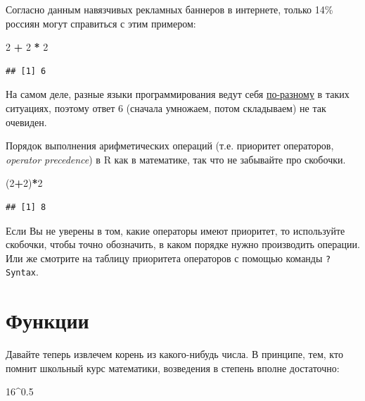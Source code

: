 \documentclass[]{book}
\newenvironment{Shaded}{\begin{snugshade}}{\end{snugshade}}
\newcommand{\DecValTok}[1]{\textcolor[rgb]{0.00,0.00,0.81}{#1}}
\newcommand{\FloatTok}[1]{\textcolor[rgb]{0.00,0.00,0.81}{#1}}
\newcommand{\StringTok}[1]{\textcolor[rgb]{0.31,0.60,0.02}{#1}}
\newcommand{\OperatorTok}[1]{\textcolor[rgb]{0.81,0.36,0.00}{\textbf{#1}}}
\newcommand{\NormalTok}[1]{#1}
\begin{document}
Согласно данным навязчивых рекламных баннеров в интернете, только 14\%
россиян могут справиться с этим примером:

\begin{Shaded}
\begin{Highlighting}[]
\DecValTok{2} \OperatorTok{+}\StringTok{ }\DecValTok{2} \OperatorTok{*}\StringTok{ }\DecValTok{2}
\end{Highlighting}
\end{Shaded}

\begin{verbatim}
## [1] 6
\end{verbatim}

На самом деле, разные языки программирования ведут себя
\href{https://www.quora.com/Do-all-computer-languages-with-operator-precedence-use-the-same-operator-precedence}{по-разному}
в таких ситуациях, поэтому ответ 6 (сначала умножаем, потом складываем)
не так очевиден.

Порядок выполнения арифметических операций (т.е. приоритет операторов,
\emph{operator precedence}) в R как в математике, так что не забывайте
про скобочки.

\begin{Shaded}
\begin{Highlighting}[]
\NormalTok{(}\DecValTok{2}\OperatorTok{+}\DecValTok{2}\NormalTok{)}\OperatorTok{*}\DecValTok{2}
\end{Highlighting}
\end{Shaded}

\begin{verbatim}
## [1] 8
\end{verbatim}

Если Вы не уверены в том, какие операторы имеют приоритет, то
используйте скобочки, чтобы точно обозначить, в каком порядке нужно
производить операции. Или же смотрите на таблицу приоритета операторов с
помощью команды \texttt{?Syntax}.

\section{Функции}\label{func}

Давайте теперь извлечем корень из какого-нибудь числа. В принципе, тем,
кто помнит школьный курс математики, возведения в степень вполне
достаточно:

\begin{Shaded}
\begin{Highlighting}[]
\DecValTok{16}\OperatorTok{^}\FloatTok{0.5}
\end{Highlighting}
\end{Shaded}
\end{document}
